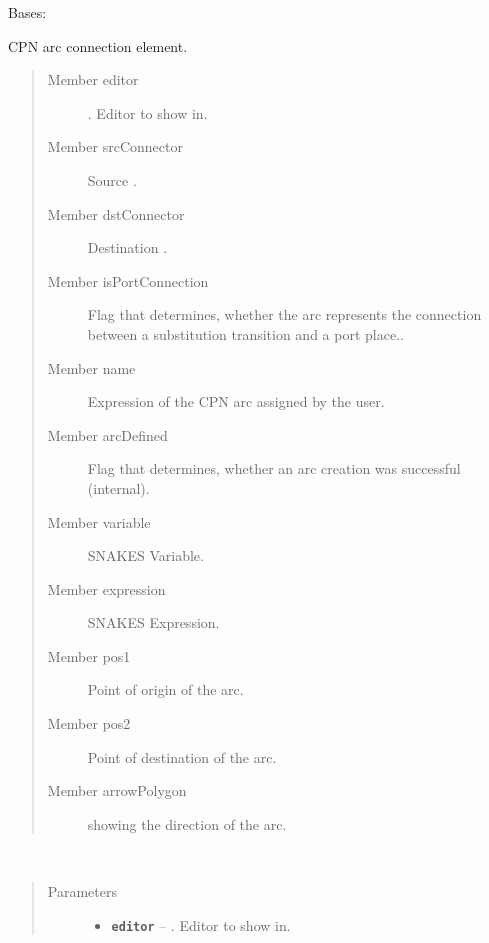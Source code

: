 \documentclass[a4paper,10pt,english]{sphinxmanual}
\begin{document}
\begin{fulllineitems}
\label{model_link:model.ArcItem.ArcItem}
Bases: 

CPN arc connection element.
\begin{quote}\begin{description}
\item[{Member editor}] \leavevmode
{}. Editor to show in.

\item[{Member srcConnector}] \leavevmode
Source .

\item[{Member dstConnector}] \leavevmode
Destination .

\item[{Member isPortConnection}] \leavevmode
Flag that determines, whether the arc represents the connection between a substitution transition and a port place..

\item[{Member name}] \leavevmode
Expression of the CPN arc assigned by the user.

\item[{Member arcDefined}] \leavevmode
Flag that determines, whether an arc creation was successful (internal).

\item[{Member variable}] \leavevmode
SNAKES Variable.

\item[{Member expression}] \leavevmode
SNAKES Expression.

\item[{Member pos1}] \leavevmode
Point of origin of the arc.

\item[{Member pos2}] \leavevmode
Point of destination of the arc.

\item[{Member arrowPolygon}] \leavevmode
{} showing the direction of the arc.

\end{description}\end{quote}

\begin{fulllineitems}
\label{model_link:model.ArcItem.ArcItem.__init__}~\begin{quote}\begin{description}
\item[{Parameters}] \leavevmode\begin{itemize}
\item {} 
\textbf{\texttt{editor}} -- . Editor to show in.


\end{itemize}
\end{description}
\end{quote}
\end{fulllineitems}
\end{fulllineitems}
\end{document}
